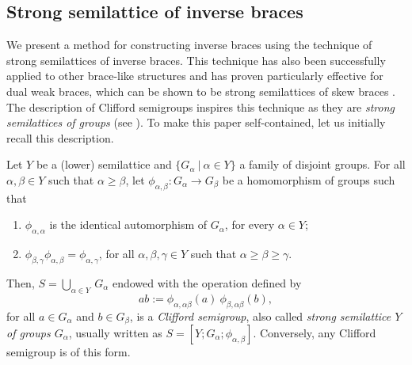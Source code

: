 \documentclass[preprint,1p]{elsarticle}
\theoremstyle{definition}               %
\newcommand{\phii}[2]{\phi_{#1,#2}}
\begin{document}
\medskip


\subsection{Strong semilattice of inverse braces}

\smallskip

We present a method for constructing inverse braces using the technique of strong semilattices of inverse braces. This technique has also been successfully applied to other brace-like structures and has proven particularly effective for dual weak braces, which can be shown to be strong semilattices of skew braces \cite[Theorem 1]{CaMaSt24}. The description of Clifford semigroups inspires this technique as they are \emph{strong semilattices of groups} (see \cite[Theorem II.2.6]{Pe84}). To make this paper self-contained, let us initially recall this description.


Let $Y$ be a (lower) semilattice and $\{G_{\alpha}\ | \ \alpha\in Y\}$ a family of disjoint groups. For all $\alpha,\beta\in Y$ such that $\alpha \geq \beta$, let $\phii{\alpha}{\beta}:G_{\alpha}\to G_{\beta}$ be a homomorphism of groups such that
 \begin{enumerate}
     \item $\phii{\alpha}{\alpha}$ is the identical automorphism of $G_{\alpha}$, for every $\alpha \in Y$;
     \item $\phii{\beta}{\gamma}{}\phii{\alpha}{\beta}{} = \phii{\alpha}{\gamma}{}$, for all $\alpha, \beta, \gamma \in Y$ such that $\alpha \geq \beta \geq \gamma$.
 \end{enumerate} 
Then, $S = \displaystyle \bigcup_{\alpha\in Y}\,G_{\alpha}$ endowed with the operation defined by
$$
    ab:= \phii{\alpha}{\alpha\beta}(a)\ \phii{\beta}{\alpha\beta}(b),
$$
for all $a\in G_{\alpha}$ and $b\in G_{\beta}$, is a \emph{Clifford semigroup}, also called \emph{strong semilattice $Y$ of groups $G_{\alpha}$}, usually written as $S=[Y; G_{\alpha}; \phii{\alpha}{\beta}]$. Conversely, any Clifford semigroup is of this form.


\smallskip
\end{document}
